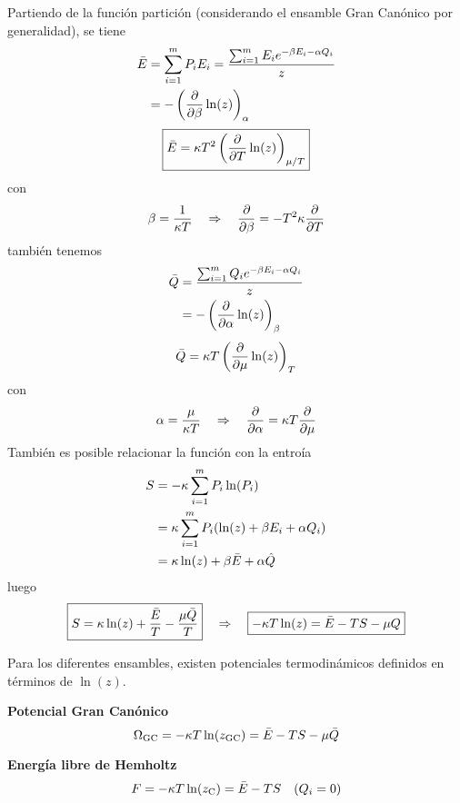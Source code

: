 Partiendo de la función partición (considerando el ensamble Gran Canónico por generalidad), se tiene
\begin{align}
  \bar{E}&=\sum_{i=1}^m P_iE_i=\frac{\sum_{i=1}^m E_ie^{-\beta E_i-\alpha Q_i}}{z}\\
  &=-\left(\pdv{\beta}\ln(z)\right)_\alpha
\end{align}
\begin{equation}
\boxed{  \bar{E}=\kappa T^2\left(\pdv{T}\ln(z)\right)_{\mu/T}}
\end{equation}
con \begin{equation}
  \beta =\frac{1}{\kappa T}\quad \Rightarrow\quad \pdv{\beta}=-T^2\kappa\pdv{T}
\end{equation}
también tenemos
\begin{align}
  \bar{Q}&=\frac{\sum_{i=1}^m Q_ie^{-\beta E_i-\alpha Q_i}}{z}\\
  &=-\left(\pdv{\alpha}\ln(z)\right)_\beta 
\end{align}
\begin{equation}
  \bar{Q}=\kappa T\left(\pdv{\mu}\ln(z)\right)_T
\end{equation}
con
\begin{equation}
  \alpha =\frac{\mu }{\kappa T}\quad \Rightarrow\quad \pdv{\alpha}=\kappa T\pdv{\mu}
\end{equation}
También es posible relacionar la función con la entroía
\begin{align}
  S&=-\kappa \sum_{i=1}^m P_i\ln(P_i)\\
  &=\kappa\sum_{i=1}^m P_i(\ln(z)+\beta E_i+\alpha Q_i)\\
  &=\kappa \ln(z)+\beta \bar{E}+\alpha \hat{Q}
\end{align}
luego
\begin{equation}
\boxed{  S=\kappa \ln(z)+\frac{\bar{E}}{T}-\frac{\mu \bar{Q}}{T}}\quad \Rightarrow\quad \boxed{-\kappa T\ln(z)=\bar{E}-TS-\mu Q}
\end{equation}

Para los diferentes ensambles, existen potenciales termodinámicos definidos en términos de $\ln(z)$.

\textbf{Potencial Gran Canónico}
\begin{equation}
  \Omega_{\rm GC}=-\kappa T\ln(z_{\rm GC})=\bar{E}-TS-\mu\bar{Q}
\end{equation}

\textbf{Energía libre de Hemholtz}
\begin{equation}
  F=-\kappa T\ln(z_{\rm C})=\bar{E}-TS\quad (Q_i=0)
\end{equation}

